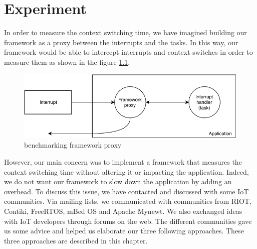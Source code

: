\chapter{Experiment \label{chap:experiment}}

In order to measure the context switching time, we have imagined building our framework as a proxy between the interrupts and the tasks.
In this way, our framework would be able to intercept interrupts and context switches in order to measure them as shown in the figure \ref{fig:proxy-framework}.

\begin{figure}[!ht]
  \centering
  \includegraphics[scale=1]{assets/proxy-framework.pdf}
  \caption{benchmarking framework proxy\label{fig:proxy-framework}}
\end{figure}


However, our main concern was to implement a framework that measures the context switching time without altering it or impacting the application.
Indeed, we do not want our framework to slow down the application by adding an overhead.
To discuss this issue, we have contacted and discussed with some IoT communities.
Via mailing lists, we communicated with communities from RIOT, Contiki, FreeRTOS, mBed OS and Apache Mynewt.
We also exchanged ideas with IoT developers through forums on the web.
The different communities gave us some advice and helped us elaborate our three following approaches.
These three approaches are described in this chapter.



